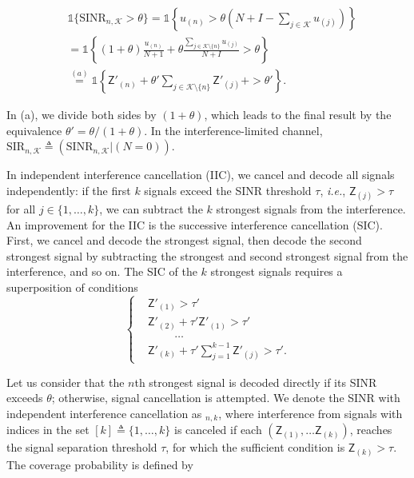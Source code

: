 \documentclass[lettersize,journal]{IEEEtran}
\begin{document}
\begin{align}
  \label{eq:IC-SINRcond}
   & \mathds{1}\{\text{SINR}_{n,\mathcal{K}} > \theta \} = \mathds{1} \left\{ u_{(n)} >\theta\left(N+I-  \sum_{j \in \mathcal{K}} u_{(j)}\right)\right\} \nonumber\\
  &\overset{}{=}\mathds{1} \left\{(1+\theta) \frac{u_{(n)}}{N+1}+ \theta \frac{\sum\limits^{}_{j\in \mathcal{K} \setminus \{n\}} u_{(j)}}{N+I}>\theta \right\} \nonumber \\
  &\overset{(a)}{=} \mathds{1} \left\{ \mathsf{Z}'_{(n)}+\theta'\sum^{}_{j\in \mathcal{K} \setminus \{n\}}\mathsf{Z}'_{(j)} +>\theta'\right\}.
\end{align}


In (a), we divide both sides by $(1+\theta)$, which leads to the final result by the equivalence $\theta' = \theta/(1+\theta)$. In the interference-limited channel, $\text{SIR}_{n,\mathcal{K}} \triangleq (\text{SINR}_{n,\mathcal{K}}|(N=0))$.




In independent interference cancellation (IIC), we cancel and decode all signals independently: if the first $k$ signals exceed the SINR threshold $\tau$, \textit{i.e.}, $\mathsf{Z}_{(j)} > \tau$ for all $j \in \{1,\dots,k\}$, we can subtract the $k$ strongest signals from the interference. An improvement for the IIC is the successive interference cancellation (SIC). First, we cancel and decode the strongest signal, then decode the second strongest signal by subtracting the strongest and second strongest signal from the interference, and so on. The SIC of the $k$ strongest signals requires a superposition of conditions
\begin{equation}
  \label{eq:SIC-SINRcond}
  \begin{cases}
    &\mathsf{Z}'_{(1)} > \tau'\\
    & \mathsf{Z}'_{(2)} + \tau' \mathsf{Z}'_{(1)}> \tau' \\
    &\hspace{1cm}\dots \\
    &\mathsf{Z}'_{(k)} + \tau' \sum_{j=1}^{k-1}\mathsf{Z}'_{(j)}> \tau'.
  \end{cases}
\end{equation}



Let us consider that the $n$th strongest signal is decoded directly if its SINR exceeds $\theta$; otherwise, signal cancellation is attempted. We denote the SINR with independent interference cancellation as $_{n,k}$, where interference from signals with indices in the set $[k] \triangleq \{1, \dots, k\}$ is canceled if each $(\mathsf{Z}_{(1)}, \dots  \mathsf{Z}_{(k)})$, reaches the signal separation threshold $\tau$, for which the sufficient condition is $\mathsf{Z}_{(k)}>\tau$. The coverage probability is defined by
\end{document}
